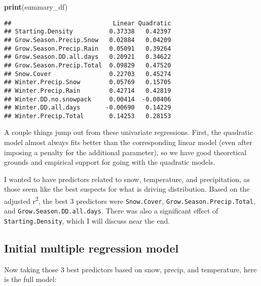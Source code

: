 \documentclass[]{article}
\newenvironment{Shaded}{\begin{snugshade}}{\end{snugshade}}
\newcommand{\KeywordTok}[1]{\textcolor[rgb]{0.13,0.29,0.53}{\textbf{#1}}}
\newcommand{\NormalTok}[1]{#1}
\begin{document}
\begin{Shaded}
\begin{Highlighting}[]
\KeywordTok{print}\NormalTok{(summary_df)}
\end{Highlighting}
\end{Shaded}

\begin{verbatim}
##                            Linear Quadratic
## Starting.Density          0.37338   0.42397
## Grow.Season.Precip.Snow   0.02884   0.04209
## Grow.Season.Precip.Rain   0.05091   0.39264
## Grow.Season.DD.all.days   0.20921   0.34622
## Grow.Season.Precip.Total  0.09829   0.47520
## Snow.Cover                0.22703   0.45274
## Winter.Precip.Snow        0.05769   0.15705
## Winter.Precip.Rain        0.42714   0.42819
## Winter.DD.no.snowpack     0.00414  -0.00406
## Winter.DD.all.days       -0.00690   0.14229
## Winter.Precip.Total       0.14253   0.28153
\end{verbatim}

A couple things jump out from these univariate regressions. First, the
quadratic model almost always fits better than the corresponding linear
model (even after imposing a penalty for the additional parameter), so
we have good theoretical grounds and empirical support for going with
the quadratic models.

I wanted to have predictors related to snow, temperature, and
precipitation, as those seem like the best suspects for what is driving
distribution. Based on the adjusted r\textsuperscript{2}, the best 3
predictors were \texttt{Snow.Cover}, \texttt{Grow.Season.Precip.Total},
and \texttt{Grow.Season.DD.all.days}. There was also a significant
effect of \texttt{Starting.Density}, which I will discuss near the end.

\hypertarget{initial-multiple-regression-model}{%
\subsection{Initial multiple regression
model}\label{initial-multiple-regression-model}}

Now taking those 3 best predictors based on snow, precip, and
temperature, here is the full model:
\end{document}
